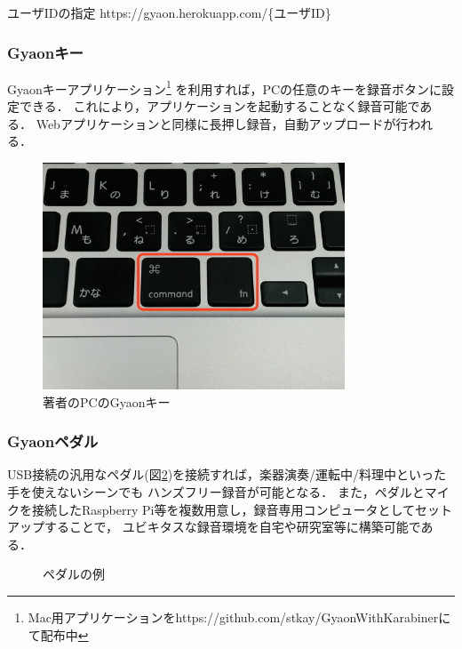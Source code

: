 \begin{itembox}[l]
{ユーザIDの指定}
https://gyaon.herokuapp.com/\{ユーザID\}
\end{itembox}

\subsubsection{Gyaonキー}
Gyaonキーアプリケーション\footnote{\textsf{Mac用アプリケーションをhttps://github.com/stkay/GyaonWithKarabinerにて配布中}}
を利用すれば，PCの任意のキーを録音ボタンに設定できる．
これにより，アプリケーションを起動することなく録音可能である．
Webアプリケーションと同様に長押し録音，自動アップロードが行われる．

\begin{figure}[H]
\centering
\includegraphics[width=9cm]{images/key.png}
\caption{著者のPCのGyaonキー}
\label{key}
\end{figure}

\subsubsection{Gyaonペダル}
USB接続の汎用なペダル(図\ref{pedal})を接続すれば，楽器演奏/運転中/料理中といった手を使えないシーンでも
ハンズフリー録音が可能となる．
また，ペダルとマイクを接続したRaspberry Pi等を複数用意し，録音専用コンピュータとしてセットアップすることで，
ユビキタスな録音環境を自宅や研究室等に構築可能である．


\begin{figure}[H]
\centering
{}
\caption{ペダルの例}
\label{pedal}
\end{figure}

